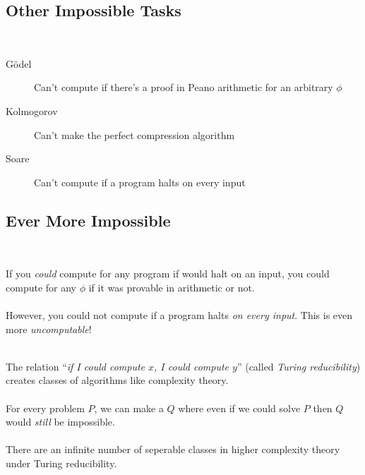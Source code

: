 \documentclass{beamer}
\begin{document}
\subsection{Other Impossible Tasks}
\begin{frame}[plain]{\insertsectionhead\ \textemdash\
    \insertsubsectionhead}

  \begin{description}
  \item[G\"odel] Can't compute if there's a proof in Peano arithmetic
    for an arbitrary $\phi$
    \cite{goedelUeberFormalUnentscheidbare1931}
  \item[Kolmogorov] Can't make the perfect compression algorithm
    \cite{kolmogorovThreeApproachesQuantitative1968}
  \item[Soare] Can't compute if a program halts on every input
    \cite{soareTuringComputabilityTheory2016}
  \end{description}

\end{frame}

\subsection{Ever More Impossible}
\begin{frame}[allowframebreaks]{\insertsectionhead\ \textemdash\
    \insertsubsectionhead}

  If you \emph{could} compute for any program if would halt on an
  input, you could compute for any $\phi$ if it was provable in
  arithmetic or not.\\~\\

  However, you could not compute if a program halts \emph{on every
    input}.  This is even more \emph{uncomputable}!\\~\\

\framebreak

  The relation ``\emph{if I could compute $x$, I could compute $y$}''
  (called \emph{Turing reducibility}) creates classes of algorithms
  like complexity theory.\\~\\

  For every problem $P$, we can make a $Q$ where even if we could
  solve $P$ then $Q$ would \emph{still} be impossible.\\~\\

  There are an infinite number of seperable classes in higher
  complexity theory under Turing reducibility.

\end{frame}
\end{document}
